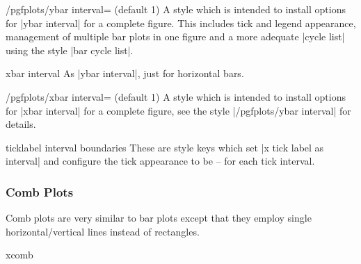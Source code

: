 \begin{stylekey}{/pgfplots/ybar interval= (default 1)}
	A style which is intended to install options for |ybar interval| for a complete figure. This includes tick and legend appearance, management of multiple bar plots in one figure and a more adequate |cycle list| using the style |bar cycle list|.
\end{stylekey}

\begin{plottype}{xbar interval}
	As |ybar interval|, just for horizontal bars. 
\begin{codeexample}[]
\end{codeexample}
\end{plottype}

\begin{stylekey}{/pgfplots/xbar interval= (default 1)}
	A style which is intended to install options for |xbar interval| for a complete figure, see the style |/pgfplots/ybar interval| for details.
\end{stylekey}

\begin{pgfplotsxykey}{\x ticklabel interval boundaries}
	These are style keys which set |x tick label as interval| and configure the tick appearance to be  --  for each tick interval.
\end{pgfplotsxykey}

\subsubsection{Comb Plots}
Comb plots are very similar to bar plots except that they employ single horizontal/vertical lines instead of rectangles.

\begin{plottype}{xcomb}
\begin{codeexample}[]
\end{codeexample}
\end{plottype}

